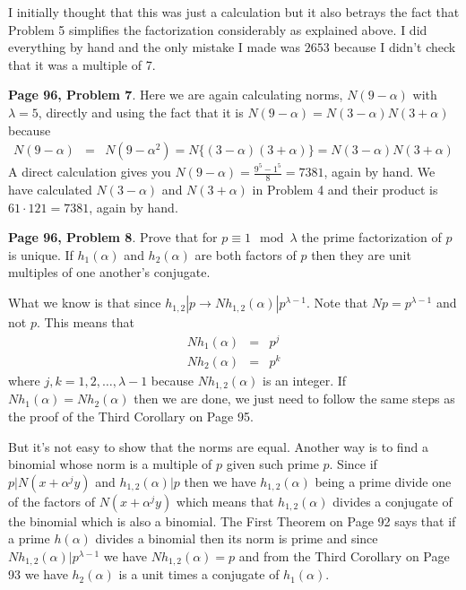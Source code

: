 \documentclass[aps,preprint,preprintnumbers,nofootinbib,showpacs,prd]{revtex4-1}
\newcommand{\nbea}{\begin{eqnarray*}}
\newcommand{\neea}{\end{eqnarray*}}
\begin{document}
I initially thought that this was just a calculation but it also betrays the fact that Problem 5 simplifies the factorization considerably as explained above. I did everything by hand and the only mistake I made was $2653$ because I didn't check that it was a multiple of 7.

{\bf Page 96, Problem 7}. Here we are again calculating norms, $N(9 - \alpha)$ with $\lambda = 5$, directly and using the fact that it is $N(9-\alpha) = N(3 - \alpha)N(3 + \alpha)$ because
%
\nbea
N(9 - \alpha) & = & N(9 - \alpha^2) = N \{(3 - \alpha) (3 + \alpha) \} = N(3 - \alpha) N(3 + \alpha)
\neea
%
A direct calculation gives you $N(9 - \alpha) = \frac{9^5 - 1^5}{8} = 7381$, again by hand. We have calculated $N(3 - \alpha)$ and $N(3 + \alpha)$ in Problem 4 and their product is $61 \cdot 121 = 7381$, again by hand.

{\bf Page 96, Problem 8}. Prove that for $p \equiv 1 \mod{\lambda}$ the prime factorization of $p$ is unique. If $h_1(\alpha)$ and $h_2(\alpha)$ are both factors of $p$ then they are unit multiples of one another's conjugate.

What we know is that since $h_{1,2}|p \to Nh_{1,2}(\alpha) | p^{\lambda - 1}$. Note that $N p = p^{\lambda - 1}$ and not $p$. This means that 
%
\nbea
Nh_1(\alpha) & = & p^j \\
Nh_2(\alpha) & = & p^k
\neea
%
where $j,k = 1,2,\dots,\lambda - 1$ because $Nh_{1,2}(\alpha)$ is an integer. If $Nh_1(\alpha) = Nh_2(\alpha)$ then we are done, we just need to follow the same steps as the proof of the Third Corollary on Page 95.

But it's not easy to show that the norms are equal. Another way is to find a binomial whose norm is a multiple of $p$ given such prime $p$. Since if $p|N(x + \alpha^j y)$ and $h_{1,2}(\alpha)|p$ then we have $h_{1,2}(\alpha)$ being a prime divide one of the factors of $N(x + \alpha^j y)$ which means that $h_{1,2}(\alpha)$ divides a conjugate of the binomial which is also a binomial. The First Theorem on Page 92 says that if a prime $h(\alpha)$ divides a binomial then its norm is prime and since $Nh_{1,2}(\alpha) | p^{\lambda - 1}$ we have $Nh_{1,2}(\alpha) = p$ and from the Third Corollary on Page 93 we have $h_2(\alpha)$ is a unit times a conjugate of $h_1(\alpha)$.
\end{document}
